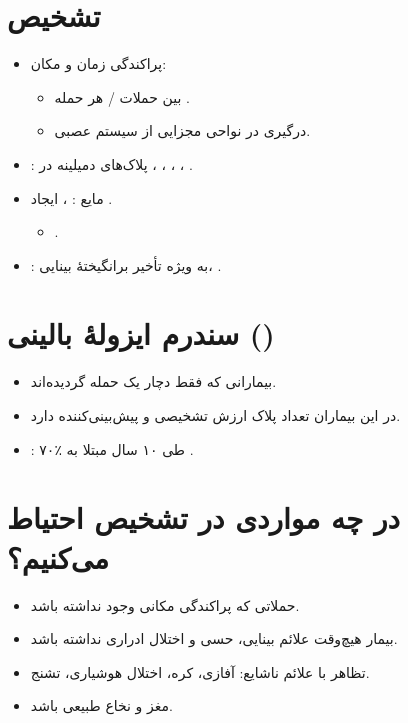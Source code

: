 \documentclass[a4paper,12pt]{extbook}
\begin{document}
\section*{تشخیص }
\begin{itemize}
\item پراکندگی زمان و مکان:
\begin{itemize}
\item بین حملات  / هر حمله .
\item درگیری در نواحی مجزایی از سیستم عصبی.
\end{itemize}
\item {}: پلاک‌های دمیلینه در ، ، ، ، .
\item مایع : ، ایجاد .
\begin{itemize}
\item {}.
\end{itemize}
\item {}: به ویژه تأخیر برانگیختهٔ بینایی، .
\end{itemize}
\section*{سندرم ایزولهٔ بالینی ()}
\begin{itemize}
\item بیمارانی که فقط دچار یک حمله گردیده‌اند.
\item در این بیماران تعداد پلاک ارزش تشخیصی و پیش‌بینی‌کننده دارد.
\item {}: ۷۰٪ طی ۱۰ سال مبتلا به .
\end{itemize}
\section*{در چه مواردی در تشخیص  احتیاط می‌کنیم؟}
\begin{itemize}
\item حملاتی که پراکندگی مکانی وجود نداشته باشد.
\item بیمار هیچ‌وقت علائم بینایی، حسی و اختلال ادراری نداشته باشد.
\item تظاهر با علائم ناشایع: آفازی، کره، اختلال هوشیاری، تشنج.
\item {} مغز و نخاع طبیعی باشد.
\end{itemize}
\end{document}
